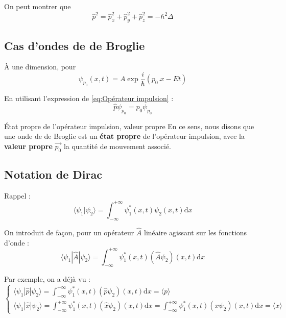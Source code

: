 On peut montrer que 
\begin{equation}
  \hat{p} ^{2} = \hat{p}_x ^{2} + \hat{p}_y ^{2} + \hat{p}_z ^{2} = - \hbar ^{2} \Delta
\end{equation}

\subsection{Cas d'ondes de de Broglie} %
\label{sub:Cas d'ondes de de Broglie}

À une dimension, pour $$\psi _{p_0}(x,t) = A \exp \frac{i}{\hbar} ({p_0} . x - Et)$$

En utilisant l'expression de \ref{eq:Opérateur impulsion} : 
\begin{equation}
  \hat{p} \psi _{p_0} = p_0 \psi _{p_0}
\end{equation}

\begin{Definition}[colbacktitle=red!75!black]{État propre de l'opérateur impulsion, valeur propre}{}
En ce sens, nous disons que une onde de de Broglie est un \textbf{état propre} de l'opérateur impulsion, avec la \textbf{valeur propre} $\overrightarrow{p_0}$ la quantité de mouvement associé.

\end{Definition}



\subsection{Notation de Dirac} %
\label{sub:Notation de Dirac}

Rappel : 
\begin{equation}
  \langle \psi_1 | \psi_2 \rangle = \int_{- \infty}^{+ \infty} \psi_1 ^{*}(x,t) \psi_2(x,t) \mathrm{d}x
\end{equation}

On introduit de façon, pour un opérateur $\hat{A}$ linéaire agissant sur les fonctions d'onde : 
\begin{equation}
  \boxed{\langle \psi_1 | \hat{A} | \psi_2 \rangle = \int_{-\infty}^{+\infty} \psi_1 ^{*}(x,t) (\hat{A} \psi_2)(x,t) \mathrm{d}x}
\end{equation}

Par exemple, on a déjà vu : 
\begin{equation}
\begin{cases}
 \langle \psi_1 | \hat{p} | \psi_2 \rangle = \int_{-\infty}^{+\infty} \psi_1 ^{*}(x,t) (\hat{p} \psi_2)(x,t) \mathrm{d}x = \langle p \rangle  \\
\langle \psi_1 | \hat{x} | \psi_2 \rangle = \int_{-\infty}^{+\infty} \psi_1 ^{*}(x,t) (\hat{x} \psi_2)(x,t) \mathrm{d}x = \int_{-\infty}^{+\infty} \psi_1 ^{*}(x,t) ({x} \psi_2)(x,t) \mathrm{d}x = \langle x \rangle
\end{cases}
\end{equation}

